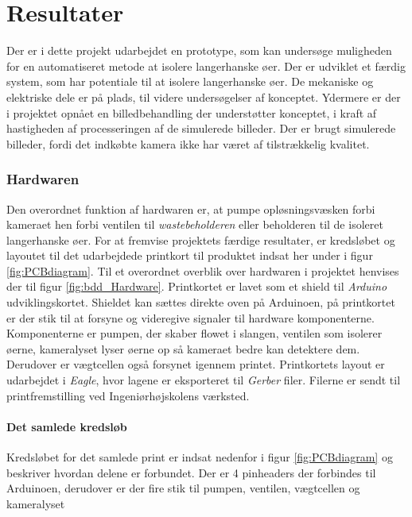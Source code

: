 \chapter{Resultater}

Der er i dette projekt udarbejdet en prototype, som kan undersøge muligheden for en automatiseret metode at isolere langerhanske øer. Der er udviklet et færdig system, som har potentiale til at isolere langerhanske øer. De mekaniske og elektriske dele er på plads, til videre undersøgelser af konceptet. Ydermere er der i projektet opnået en billedbehandling der understøtter konceptet, i kraft af hastigheden af processeringen af de simulerede billeder. Der er brugt simulerede billeder, fordi det indkøbte kamera ikke har været af tilstrækkelig kvalitet.



\subsection{Hardwaren}

Den overordnet funktion af hardwaren er, at pumpe opløsningsvæsken forbi kameraet hen forbi ventilen til \textit{wastebeholderen} eller beholderen til de isoleret langerhanske øer. For at fremvise projektets færdige resultater, er kredsløbet og layoutet til det udarbejdede printkort til produktet indsat her under i figur \ref{fig:PCBdiagram}. Til et overordnet overblik over hardwaren i projektet henvises der til figur \ref{fig:bdd_Hardware}. Printkortet er lavet som et shield til \textit{Arduino} udviklingskortet. Shieldet kan sættes direkte oven på Arduinoen, på printkortet er der stik til at forsyne og videregive signaler til hardware komponenterne. Komponenterne er pumpen, der skaber flowet i slangen, ventilen som isolerer øerne, kameralyset lyser øerne op så kameraet bedre kan detektere dem. Derudover er vægtcellen også forsynet igennem printet. Printkortets layout er udarbejdet i \textit{Eagle}, hvor lagene er eksporteret til \textit{Gerber} filer. Filerne er sendt til printfremstilling ved Ingeniørhøjskolens værksted.

\newpage
\subsubsection{Det samlede kredsløb}

Kredsløbet for det samlede print er indsat nedenfor i figur \ref{fig:PCBdiagram} og beskriver hvordan delene er forbundet. Der er 4 pinheaders der forbindes til Arduinoen, derudover er der fire stik til pumpen, ventilen, vægtcellen og kameralyset 

